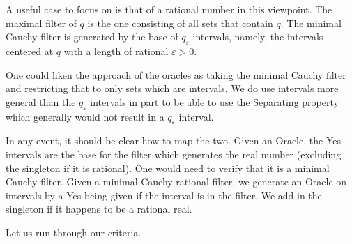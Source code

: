 \documentclass[12pt]{article}
\begin{document}
A useful case to focus on is that of a rational number in this viewpoint. The maximal filter of $q$ is the one consisting of all sets that contain $q$. The minimal Cauchy filter is generated by the base of $q_{\varepsilon}$ intervals, namely, the intervals centered at $q$ with a length of rational $\varepsilon>0$.

One could liken the approach of the oracles as taking the minimal Cauchy filter and restricting that to only sets which are intervals. We do use intervals more general than the $q_{\varepsilon}$ intervals in part to be able to use the Separating property which generally would not result in a $q_\varepsilon$ interval. 

In any event, it should be clear how to map the two. Given an Oracle, the Yes intervals are the base for the filter which generates the real number (excluding the singleton if it is rational). One would need to verify that it is a minimal Cauchy filter. Given a minimal Cauchy rational filter, we generate an Oracle on intervals by a Yes being given if the interval is in the filter. We add in the singleton if it happens to be a rational real. 

Let us run through our criteria. 
\end{document}
